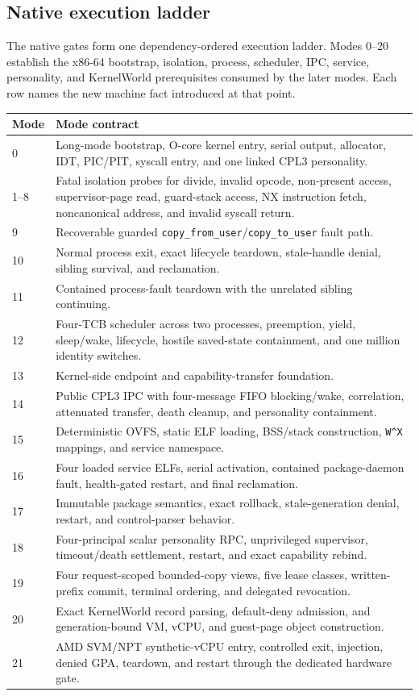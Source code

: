 \documentclass[11pt,oneside]{article}
\begin{document}
\subsection{Native execution ladder}

The native gates form one dependency-ordered execution ladder. Modes 0--20
establish the x86-64 bootstrap, isolation, process, scheduler, IPC, service,
personality, and KernelWorld prerequisites consumed by the later modes. Each
row names the new machine fact introduced at that point.

\begin{longtable}{P{0.10\textwidth} P{0.82\textwidth}}
\toprule
\textbf{Mode} & \textbf{Mode contract} \\
\midrule
{} & Long-mode bootstrap, O-core kernel entry, serial output, allocator, IDT,
PIC/PIT, syscall entry, and one linked CPL3 personality. \\
1--8 & Fatal isolation probes for divide, invalid opcode, non-present access,
supervisor-page read, guard-stack access, NX instruction fetch, noncanonical
address, and invalid syscall return. \\
9 & Recoverable guarded \texttt{copy\_from\_user}/\texttt{copy\_to\_user} fault path. \\
10 & Normal process exit, exact lifecycle teardown, stale-handle denial, sibling
survival, and reclamation. \\
11 & Contained process-fault teardown with the unrelated sibling continuing. \\
12 & Four-TCB scheduler across two processes, preemption, yield, sleep/wake,
lifecycle, hostile saved-state containment, and one million identity switches. \\
13 & Kernel-side endpoint and capability-transfer foundation. \\
14 & Public CPL3 IPC with four-message FIFO blocking/wake, correlation,
attenuated transfer, death cleanup, and personality containment. \\
15 & Deterministic OVFS, static ELF loading, BSS/stack construction,
\texttt{W\textasciicircum X}
mappings, and service namespace. \\
16 & Four loaded service ELFs, serial activation, contained package-daemon
fault, health-gated restart, and final reclamation. \\
17 & Immutable package semantics, exact rollback, stale-generation denial,
restart, and control-parser behavior. \\
18 & Four-principal scalar personality RPC, unprivileged supervisor,
timeout/death settlement, restart, and exact capability rebind. \\
19 & Four request-scoped bounded-copy views, five lease classes, written-prefix
commit, terminal ordering, and delegated revocation. \\
20 & Exact KernelWorld record parsing, default-deny admission, and
generation-bound VM, vCPU, and guest-page object construction. \\
21 & AMD SVM/NPT synthetic-vCPU entry, controlled exit, injection, denied GPA,
teardown, and restart through the dedicated hardware gate. \\
\bottomrule
\end{longtable}
\end{document}
